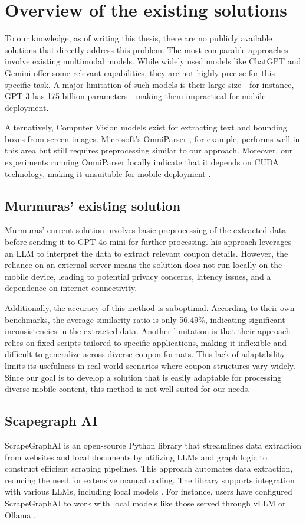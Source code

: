 \documentclass[licencjacka,en]{pracamgr}
\begin{document}
\chapter{Overview of the existing solutions}
To our knowledge, as of writing this thesis, there are no publicly available solutions that directly address this problem. The most comparable approaches involve existing multimodal models. While widely used models like ChatGPT and Gemini offer some relevant capabilities, they are not highly precise for this specific task. A major limitation of such models is their large size—for instance, GPT-3 has 175 billion parameters\cite{chatgpt_params}—making them impractical for mobile deployment.

Alternatively, Computer Vision models exist for extracting text and bounding boxes from screen images. Microsoft’s OmniParser \cite{omniparser_intro}, for example, performs well in this area but still requires preprocessing similar to our approach. Moreover, our experiments running OmniParser locally indicate that it depends on CUDA technology, making it unsuitable for mobile deployment \cite{OUR EXPERIMENTS???}.



\section{Murmuras' existing solution} 
Murmuras’ current solution involves basic preprocessing of the extracted data before sending it to GPT-4o-mini for further processing. his approach leverages an LLM to interpret the data to extract relevant coupon details. However, the reliance on an external server means the solution does not run locally on the mobile device, leading to potential privacy concerns, latency issues, and a dependence on internet connectivity. 

Additionally, the accuracy of this method is suboptimal. According to their own benchmarks, the average similarity ratio is only 56.49\%, indicating significant inconsistencies in the extracted data. Another limitation is that their approach relies on fixed scripts tailored to specific applications, making it inflexible and difficult to generalize across diverse coupon formats. This lack of adaptability limits its usefulness in real-world scenarios where coupon structures vary widely. Since our goal is to develop a solution that is easily adaptable for processing diverse mobile content, this method is not well-suited for our needs.


\section{Scapegraph AI}
ScrapeGraphAI is an open-source Python library that streamlines data extraction from websites and local documents by utilizing LLMs and graph logic to construct efficient scraping pipelines. This approach automates data extraction, reducing the need for extensive manual coding. The library supports integration with various LLMs, including local models \cite{scapegraph_intro}. For instance, users have configured ScrapeGraphAI to work with local models like those served through vLLM \cite{gh_issue_810_scapegraph} or Ollama \cite{gh_issue_752_scapegraph}.
\end{document}
